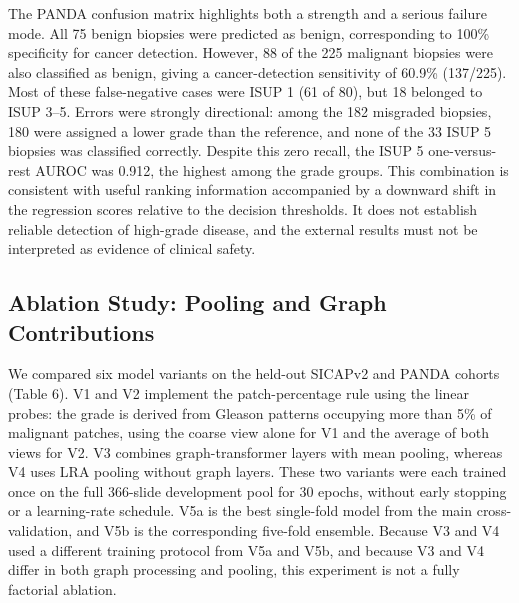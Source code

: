 \documentclass[11pt,a4paper]{article}
\begin{document}
The PANDA confusion matrix highlights both a strength and a serious failure mode. All 75 benign biopsies were predicted as benign, corresponding to 100\% specificity for cancer detection. However, 88 of the 225 malignant biopsies were also classified as benign, giving a cancer-detection sensitivity of 60.9\% (137/225). Most of these false-negative cases were ISUP 1 (61 of 80), but 18 belonged to ISUP 3--5. Errors were strongly directional: among the 182 misgraded biopsies, 180 were assigned a lower grade than the reference, and none of the 33 ISUP 5 biopsies was classified correctly. Despite this zero recall, the ISUP 5 one-versus-rest AUROC was 0.912, the highest among the grade groups. This combination is consistent with useful ranking information accompanied by a downward shift in the regression scores relative to the decision thresholds. It does not establish reliable detection of high-grade disease, and the external results must not be interpreted as evidence of clinical safety.


\subsection{Ablation Study: Pooling and Graph Contributions}
We compared six model variants on the held-out SICAPv2 and PANDA cohorts (Table 6). V1 and V2 implement the patch-percentage rule using the linear probes: the grade is derived from Gleason patterns occupying more than 5\% of malignant patches, using the coarse view alone for V1 and the average of both views for V2. V3 combines graph-transformer layers with mean pooling, whereas V4 uses LRA pooling without graph layers. These two variants were each trained once on the full 366-slide development pool for 30 epochs, without early stopping or a learning-rate schedule. V5a is the best single-fold model from the main cross-validation, and V5b is the corresponding five-fold ensemble. Because V3 and V4 used a different training protocol from V5a and V5b, and because V3 and V4 differ in both graph processing and pooling, this experiment is not a fully factorial ablation.
\end{document}

